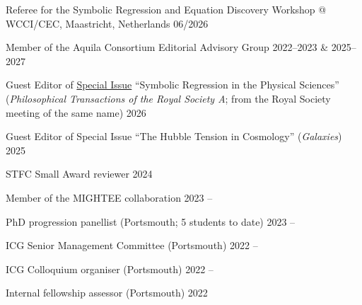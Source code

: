 \documentclass[11pt]{article}
\begin{document}
\vspace{0.5\baselineskip}

Referee for the Symbolic Regression and Equation Discovery Workshop @ WCCI/CEC, Maastricht, Netherlands \hfill 06/2026

\vspace{0.5\baselineskip}

Member of the Aquila Consortium Editorial Advisory Group \hfill 2022--2023 \& 2025--2027



\vspace{0.5\baselineskip}

Guest Editor of \href{https://doi.org/10.1098/rsta.2024.0600}{Special Issue} ``Symbolic Regression in the Physical Sciences'' (\textit{Philosophical Transactions of the Royal Society A}; from the Royal Society meeting of the same name) \hfill 2026

\vspace{0.5\baselineskip}

Guest Editor of Special Issue ``The Hubble Tension in Cosmology'' (\textit{Galaxies}) \hfill 2025

\vspace{0.5\baselineskip}

STFC Small Award reviewer \hfill 2024

\vspace{0.5\baselineskip}

Member of the MIGHTEE collaboration \hfill 2023 --

\vspace{0.5\baselineskip}

PhD progression panellist (Portsmouth; 5 students to date) \hfill 2023 --

\vspace{0.5\baselineskip}

ICG Senior Management Committee (Portsmouth) \hfill 2022 --

\vspace{0.5\baselineskip}

ICG Colloquium organiser (Portsmouth) \hfill 2022 --

\vspace{0.5\baselineskip}

Internal fellowship assessor (Portsmouth) \hfill 2022

\vspace{0.5\baselineskip}
\end{document}
